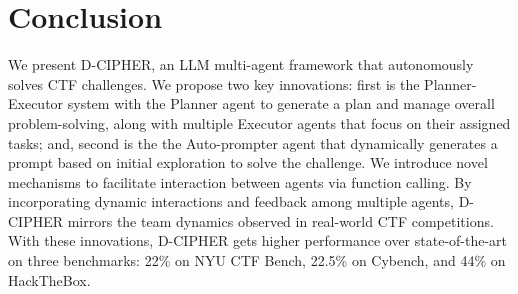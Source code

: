 \section{Conclusion} \label{sec:conclusion}

We present D-CIPHER, an LLM multi-agent framework that autonomously solves CTF challenges. We propose two key innovations: first is the Planner-Executor system with the Planner agent to generate a plan and manage overall problem-solving, along with multiple Executor agents that focus on their assigned tasks; and, second is the the Auto-prompter agent that dynamically generates a prompt based on initial exploration to solve the challenge.
We introduce novel mechanisms to facilitate interaction between agents via function calling. 
By incorporating dynamic interactions and feedback among multiple agents, D-CIPHER mirrors the team dynamics observed in real-world CTF competitions.
With these innovations, D-CIPHER gets higher performance over state-of-the-art on three benchmarks: 22\% on NYU CTF Bench, 22.5\% on Cybench, and 44\% on HackTheBox.


